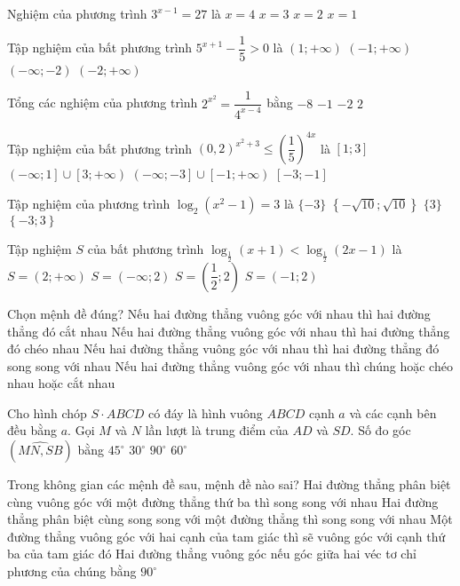 \begin{ex}
Nghiệm của phương trình ${3^{x-1}}=27$ là
\choice
{$x=4$}
{$x=3$}
{$x=2$}
{$x=1$}
\end{ex}
\begin{ex}
Tập nghiệm của bất phương trình ${5^{x+1}}-\dfrac{1}{5}>0$ là
\choice
{$\left(1;+\infty\right)$}
{$\left(-1;+\infty\right)$}
{$\left(-\infty ;-2\right)$}
{$\left(-2;+\infty\right)$}
\end{ex}
\begin{ex}
Tổng các nghiệm của phương trình ${2^{x^2}}=\dfrac{1}{{4^{x-4}}}$ bằng
\choice
{$-8$}
{$-1$}
{$-2$}
{$2$}
\end{ex}
\begin{ex}
Tập nghiệm của bất phương trình ${{\left(0{,}2\right)}^{x^2+3}}\le {{\left(\dfrac{1}{5}\right)}^{4x}}$ là
\choice
{$[1;3]$}
{$\left(-\infty ;1\right]\cup \left[3;+\infty\right)$}
{$\left(-\infty ;-3\right]\cup \left[-1;+\infty\right)$}
{$[-3;-1]$}
\end{ex}
\begin{ex}
Tập nghiệm của phương trình $\log _2\left(x^2-1\right)=3$ là
	\choice
	{$\{-3\}$}
	{$\left\{ -\sqrt{10};\sqrt{10} \right\}$}
	{$\{3\}$}
	{$\left\{ -3;3 \right\}$}
\end{ex}
\begin{ex}
	Tập nghiệm ${S}$ của bất phương trình $\log_{\tfrac{1}{2}}(x+1)<{{\log }_{\tfrac{1}{2}}}(2x-1)$ là
	\choice
	{$S=\left(2;+\infty\right)$}
	{$S=\left(-\infty ;2\right)$}
	{$S=\left(\dfrac{1}{2};2\right)$}
	{$S=(-1;2)$}
\end{ex}
\begin{ex}
Chọn mệnh đề đúng?
\choice
{Nếu hai đường thẳng vuông góc với nhau thì hai đường thẳng đó cắt nhau}
{Nếu hai đường thẳng vuông góc với nhau thì hai đường thẳng đó chéo nhau}
{Nếu hai đường thẳng vuông góc với nhau thì hai đường thẳng đó song song với nhau}
{Nếu hai đường thẳng vuông góc với nhau thì chúng hoặc chéo nhau hoặc cắt nhau}
\end{ex}
\begin{ex}
Cho hình chóp $S \cdot ABCD$ có đáy là hình vuông $ABCD$ cạnh $a$ và các cạnh bên đều bằng $a$. Gọi $M$ và $N$ lần lượt là trung điểm của $AD$ và $SD$. Số đo góc $\left(\widehat{MN,SB}\right)$ bằng
\choice
{$45^\circ $}
{$30^\circ $}
{$90^\circ $}
{$60^\circ $}
\end{ex}
\begin{ex}
Trong không gian các mệnh đề sau, mệnh đề nào sai?
\choice
{Hai đường thẳng phân biệt cùng vuông góc với một đường thẳng thứ ba thì song song với nhau}
{Hai đường thẳng phân biệt cùng song song với một đường thẳng thì song song với nhau}
{Một đường thẳng vuông góc với hai cạnh của tam giác thì sẽ vuông góc với cạnh thứ ba của tam giác đó}
{Hai đường thẳng vuông góc nếu góc giữa hai véc tơ chỉ phương của chúng bằng $90^\circ $}
\end{ex}
